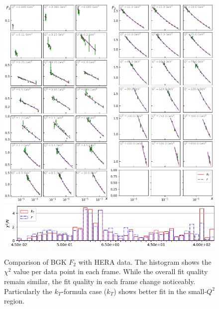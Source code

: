 \documentclass[12pt]{article}
\numberwithin{equation}{section}
\numberwithin{table}{section}
\numberwithin{figure}{section}
\begin{document}
\begin{figure}[p]
\includegraphics[width=0.49\textwidth]{./plots/Figure_2-1.png}
\includegraphics[width=0.49\textwidth]{./plots/Figure_2-2.png}
\includegraphics[width=\textwidth]{./plots/Figure_2-3.png}
\caption{Comparison of BGK $F_2$ with HERA data. The histogram shows the $\chi^2$ value per data point in each frame. While the overall fit quality remain similar, the fit quality in each frame change noticeably. Particularly the $k_T$-formula case ($k_T$) shows better fit in the small-$Q^2$ region.}
\label{fig:BGK-Grid}
\end{figure}
\end{document}

